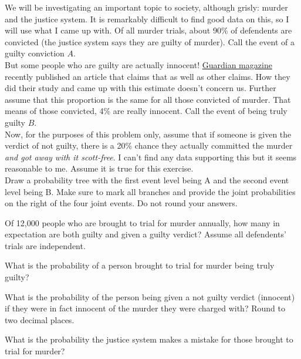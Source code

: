 \documentclass[12pt]{article}
\begin{document}
\eenum


\problem We will be investigating an important topic to society, although grisly: murder and the justice system. It is remarkably difficult to find good data on this, so I will use what I came up with. Of all murder trials, about 90\% of defendents are convicted (the justice system says they are guilty of murder). Call the event of a guilty conviction $A$. \\

But some people who are guilty are actually innocent! \href{http://www.theguardian.com/world/2014/apr/28/death-penalty-study-4-percent-defendants-innocent}{Guardian magazine} recently published an article that claims that  as well as other claims. How they did their study and came up with this estimate doesn't concern us. Further assume that this proportion is the same for all those convicted of murder. That means of those convicted, 4\% are really innocent. Call the event of being truly guilty $B$. \\

Now, for the purposes of this problem only, assume that if someone is given the verdict of not guilty, there is a 20\% chance they actually committed the murder \textit{and got away with it scott-free}. I can't find any data supporting this but it seems reasonable to me. Assume it is true for this exercise.\\

\benum
{} Draw a probability tree with the first event level being A and the second event level being B. Make sure to mark all branches and provide the joint probabilities on the right of the four joint events. Do not round your answers. 

 Of 12,000 people who are brought to trial for murder annually, how many in expectation are both guilty and given a guilty verdict? Assume all defendents' trials are independent. 

 What is the probability of a person brought to trial for murder being truly guilty? 

 What is the probability of the person being given a not guilty verdict (innocent) if they were in fact innocent of the murder they were charged with? Round to two decimal places.

 What is the probability the justice system makes a mistake for those brought to trial for murder? 
\end{document}
